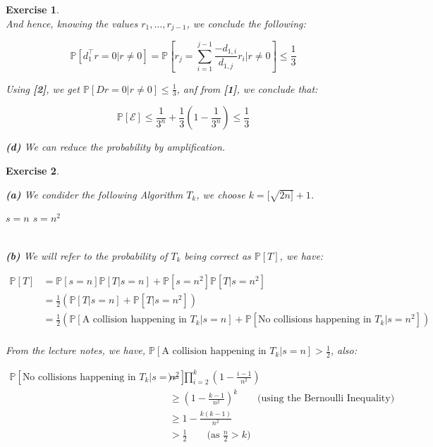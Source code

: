 \documentclass{article}
\newtheorem{exo}{Exercise}
\def\P{\mathbb{P}}
\begin{document}
\begin{exo}{\ \\}
And hence, knowing the values $r_1, \dots, r_{j-1}$, we conclude the following:


\[
\P[d_1^\top r = 0 | r\neq0]
= \P\left[r_j = \sum^{j-1}_{i=1} \frac{-d_{1,i}}{d_{1,j}} r_i |r\neq0\right] \leq \frac{1}{3} 
\]

Using \textbf{[2]}, we get $\P[D r = 0 | r\neq0] \leq \frac{1}{3}$, anf from \textbf{[1]}, we conclude that:

\[
\P[\mathcal{E}] \leq \frac{1}{3^n} + \frac{1}{3}(1- \frac{1}{3^n} ) \leq \frac{1}{3} 
\]

\noindent
\textbf{(d)} We can reduce the probability by amplification.

\end{exo}

\begin{exo}{\ \\}


\noindent 
\textbf{(a)} We condider the following Algorithm $T_k$, we choose $k = [\sqrt{2n]} + 1$. \\



\begin{algorithmic}[1]
\State {}
    \State \Return $s=n$
\EndIf
\State \Return $s = n^2$
\end{algorithmic}

\noindent
\\\textbf{(b)} We will refer to the probability of $T_k$ being correct as $\P[T]$, we have: 

\begin{align*}
    \P[T] 
    &= \P[s=n]\P[T|s=n] + \P[s=n^2]\P[T|s=n^2] \\
    &= \frac{1}{2} (\P[T|s=n] + \P[T|s=n^2]) \\
    &= \frac{1}{2} (\P[\text{A collision happening in $T_k$}|s=n] 
    + \P[\text{No collisions happening in $T_k$}|s=n^2]) \\
\end{align*}

From the lecture notes, we have, $\P[\text{A collision happening in $T_k$}|s=n] > \frac{1}{2}$, also:

\begin{align*}
    \P[\text{No collisions happening in $T_k$}|s=n^2]) 
    &= \prod_{i=2}^{k} (1-\frac{i-1}{n^2})  \\
    &\geq (1-\frac{k-1}{n^2})^k 
    \quad \quad \text{(using the Bernoulli Inequality)}\\
    &\geq 1 - \frac{k(k-1)}{n^2} \\
    &> \frac{1}{2}
    \quad \quad \text{(as $\frac{n}{2} > k)$}\\
\end{align*}


\end{exo}
\end{document}
